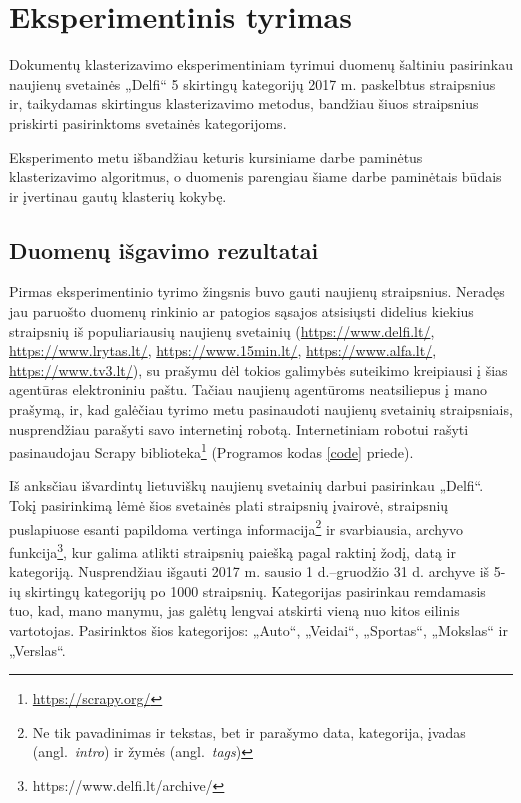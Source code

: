 \documentclass{VUMIFInfKursinis}
\newcommand{\ltang}[2]{#1 (angl.\  \textit{#2}) }
\begin{document}
\section{Eksperimentinis tyrimas}

Dokumentų klasterizavimo eksperimentiniam tyrimui duomenų šaltiniu
pasirinkau naujienų svetainės „Delfi“ 5 skirtingų kategorijų 2017 m.
paskelbtus straipsnius ir, taikydamas skirtingus klasterizavimo metodus,
bandžiau šiuos straipsnius priskirti pasirinktoms svetainės
kategorijoms.

Eksperimento metu išbandžiau keturis kursiniame darbe paminėtus
klasterizavimo algoritmus, o duomenis parengiau šiame darbe paminėtais
būdais ir įvertinau gautų klasterių kokybę.






\subsection{Duomenų išgavimo rezultatai}

Pirmas eksperimentinio tyrimo žingsnis buvo gauti naujienų straipsnius.
Neradęs jau paruošto duomenų rinkinio ar patogios
sąsajos atsisiųsti didelius kiekius straipsnių iš populiariausių
naujienų svetainių (\url{https://www.delfi.lt/},
\url{https://www.lrytas.lt/}, \url{https://www.15min.lt/},
\url{https://www.alfa.lt/}, \url{https://www.tv3.lt/}), su prašymu dėl
tokios galimybės suteikimo kreipiausi į šias agentūras elektroniniu
paštu. Tačiau naujienų agentūroms neatsiliepus į mano prašymą, ir, kad
galėčiau tyrimo metu pasinaudoti naujienų svetainių straipsniais,
nusprendžiau parašyti savo internetinį robotą. Internetiniam robotui rašyti pasinaudojau Scrapy
biblioteka\footnote{\url{https://scrapy.org/}} (Programos kodas \ref{code} priede).

Iš anksčiau išvardintų lietuviškų naujienų svetainių darbui pasirinkau
„Delfi“. Tokį pasirinkimą lėmė šios svetainės plati straipsnių
įvairovė, straipsnių puslapiuose esanti papildoma vertinga
informacija\footnote{Ne tik pavadinimas ir tekstas, bet ir parašymo
  data, kategorija, \ltang{įvadas}{intro} ir \ltang{žymės}{tags}} ir svarbiausia, archyvo funkcija\footnote{https://www.delfi.lt/archive/},
kur galima atlikti straipsnių paiešką pagal raktinį žodį, datą ir
kategoriją. Nusprendžiau išgauti 2017 m. sausio 1 d.–gruodžio 31 d.
archyve iš 5-ių skirtingų kategorijų po 1000 straipsnių. Kategorijas
pasirinkau remdamasis tuo, kad, mano manymu, jas galėtų lengvai atskirti
vieną nuo kitos eilinis vartotojas. Pasirinktos šios kategorijos:
„Auto“, „Veidai“, „Sportas“, „Mokslas“ ir „Verslas“.
\end{document}
